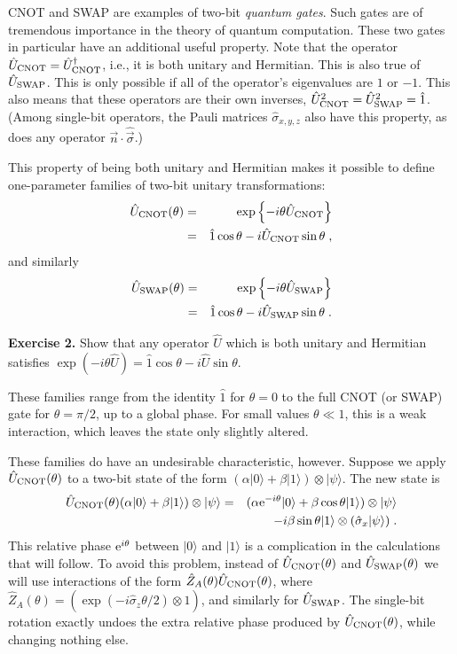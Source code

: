 \documentclass[12pt]{article}
\def\ket#1{{| #1 \rangle}}
\def\sx{{\hat\sigma_x}}
\def\sz{{\hat\sigma_z}}
\def\svec{{\hat{\vec\sigma}}}
\def\id{{\hat 1}}
\def\e{{\rm e}}
\def\U{{\hat U}}
\def\Udag{{\hat U^\dagger}}
\def\Z{{\hat Z}}
\begin{document}
CNOT and SWAP are examples of two-bit {\it quantum gates}.  Such gates are
of tremendous importance in the theory of quantum computation.  These two
gates in particular have an additional useful property.  Note that
the operator $\U_{\rm CNOT} = \Udag_{\rm CNOT}$, i.e., it is both
unitary and Hermitian.  This is also true of $\U_{\rm SWAP}$.  This is only
possible if all of the operator's eigenvalues are $1$ or $-1$.  This
also means that these operators are their own inverses,
$\U^2_{\rm CNOT} = \U^2_{\rm SWAP} = \id$.  (Among single-bit operators,
the Pauli matrices ${\hat\sigma}_{x,y,z}$ also have this property,
as does any operator ${\vec n}\cdot\svec$.)

This property of being both unitary and Hermitian makes it possible to
define one-parameter families of two-bit unitary transformations:
\begin{eqnarray}
\U_{\rm CNOT}(\theta) &=&
  \exp\left\{ - i \theta \U_{\rm CNOT} \right\} \nonumber\\
&=& \id \cos\theta - i \U_{\rm CNOT} \sin\theta \;,
\end{eqnarray}
and similarly 
\begin{eqnarray}
\U_{\rm SWAP}(\theta) &=&
  \exp\left\{ - i \theta \U_{\rm SWAP} \right\} \nonumber\\
&=& \id \cos\theta - i \U_{\rm SWAP} \sin\theta \;.
\end{eqnarray}

\medskip\noindent
{\bf Exercise 2.}  Show that any operator $\U$ which is both unitary and
Hermitian satisfies $\exp(-i\theta\U) = \id\cos\theta - i \U\sin\theta$.
\medskip

These families range from the
identity $\id$ for $\theta=0$ to the full CNOT (or SWAP) gate for
$\theta=\pi/2$, up to a global phase.
For small values $\theta \ll 1$, this is a weak
interaction, which leaves the state only slightly altered.

These families do have an undesirable characteristic, however.  Suppose
we apply $\U_{\rm CNOT}(\theta)$ to a two-bit state of the form
$(\alpha\ket0 + \beta\ket1)\otimes\ket\psi$.  The new state is
\begin{eqnarray}
\U_{\rm CNOT}(\theta) (\alpha\ket0 + \beta\ket1)\otimes\ket\psi
  &=& (\alpha\e^{-i\theta}\ket0 + \beta\cos\theta\ket1) \otimes \ket\psi
  \nonumber\\
&&  - i \beta\sin\theta\ket1\otimes(\sx\ket\psi) \;.
\end{eqnarray}
This relative phase $\e^{i\theta}$ between $\ket0$ and $\ket1$ is a
complication in the calculations that will follow.  To avoid this problem,
instead of $\U_{\rm CNOT}(\theta)$ and $\U_{\rm SWAP}(\theta)$ we
will use interactions of the form
$\Z_A(\theta)\U_{\rm CNOT}(\theta)$, where
$\Z_A(\theta) = (\exp(-i\sz\theta/2)\otimes\id)$,
and similarly for $\U_{\rm SWAP}$.  The single-bit rotation exactly undoes the 
extra relative phase produced by $\U_{\rm CNOT}(\theta)$, while changing
nothing else.
\end{document}
